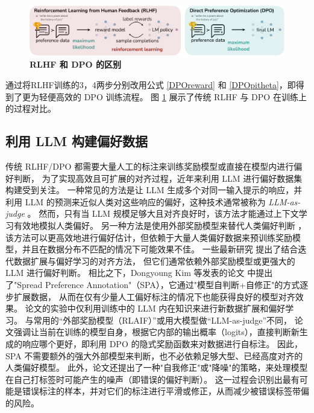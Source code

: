 \begin{figure}
    \centering
	{
	\includegraphics[width=15cm]{figure/teaser.png}
	\vspace{-0.2cm}
    \caption{\textbf{RLHF 和 DPO 的区别}}
    \label{fig:RHLFvsDPO}
	}
\end{figure}

通过将RLHF训练的3，4两步分别改用公式 \ref{DPOreward} 和 \ref{DPOpitheta}，即得到了更为轻便高效的 DPO 训练流程。
图 \ref{fig:RHLFvsDPO} 展示了传统 RLHF 与 DPO 在训练上的过程对比。


\subsection{利用 LLM 构建偏好数据}

传统 RLHF/DPO 都需要大量人工的标注来训练奖励模型或直接在模型内进行偏好判断，
为了实现高效且可扩展的对齐过程，近年来利用 LLM 进行偏好数据集构建受到关注。  
一种常见的方法是让 LLM 生成多个对同一输入提示的响应，并利用 LLM 的预测来近似人类对这些响应的偏好，这种技术通常被称为 \textit{LLM-as-judge} \citep{bai2022training, yuan2024self}。  
然而，只有当 LLM 规模足够大且对齐良好时，该方法才能通过上下文学习有效地模拟人类偏好。  
另一种方法是使用外部奖励模型来替代人类偏好判断 \citep{jiang2023llm, snorkel2024pairrm}，该方法可以更高效地进行偏好估计，但依赖于大量人类偏好数据来预训练奖励模型，并且在数据分布不匹配的情况下可能效果不佳。  
一些最新研究 \citep{rosset2024direct, snorkel2024pairrm, wu2024self, xiong2024iterative} 提出了结合迭代数据扩展与偏好学习的对齐方法，  
但它们通常依赖外部奖励模型或更强大的 LLM 进行偏好判断。  
相比之下，Dongyoung Kim 等发表的论文 \citep{Lee2024Rlaif,Yuan2024Self,Kim2025Spread}中提出了"Spread Preference Annotation"（SPA），它通过"模型自判断+自修正"的方式逐步扩展数据，
从而在仅有少量人工偏好标注的情况下也能获得良好的模型对齐效果。
论文的实验中仅利用训练中的 LLM 内在知识来进行新数据扩展和偏好学习。 
与常用的“外部奖励模型（RLAIF）”或用大模型做“LLM-as-judge”\citep{bai2022training, yuan2024self}不同，
论文强调让当前在训练的模型自身，根据它内部的输出概率（logits），直接判断新生成的响应哪个更好，即利用 DPO 的隐式奖励函数来对数据进行自标注。
因此，SPA 不需要额外的强大外部模型来判断，也不必依赖足够大型、已经高度对齐的人类偏好模型。
此外，论文还提出了一种"自我修正"或"降噪"的策略，来处理模型在自己打标签时可能产生的噪声（即错误的偏好判断）。
这一过程会识别出最有可能是错误标注的样本，并对它们的标注进行平滑或修正，从而减少被错误标签带偏的风险。


